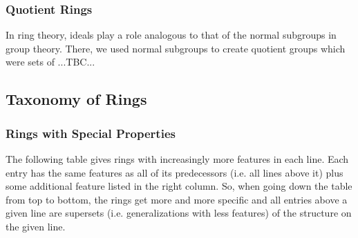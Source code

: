 

\subsubsection{Quotient Rings}
In ring theory, ideals play a role analogous to that of the normal subgroups in group theory. There, we used normal subgroups to create quotient groups which were sets of ...TBC...









\subsection{Taxonomy of Rings}

\subsubsection{Rings with Special Properties}
The following table gives rings with increasingly more features in each line. Each entry has the same features as all of its predecessors (i.e. all lines above it) plus some additional feature listed in the right column. So, when going down the table from top to bottom, the rings get more and more specific and all entries above a given line are supersets (i.e. generalizations with less features) of the structure on the given line.

